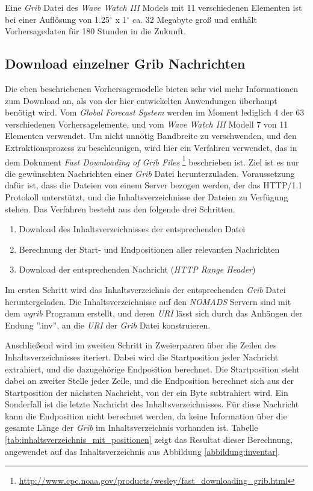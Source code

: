 Eine \textit{Grib} Datei des \textit{Wave Watch III} Models mit 11
verschiedenen Elementen ist bei einer Auflösung von
1.25$^{\circ}$ x 1$^{\circ}$ ca. 32 Megabyte groß und enthält
Vorhersagedaten für 180 Stunden in die Zukunft.

\subsection{Download einzelner Grib Nachrichten}
\label{subsec:download}

Die eben beschriebenen Vorhersagemodelle bieten sehr viel mehr
Informationen zum Download an, als von der hier entwickelten
Anwendungen überhaupt benötigt wird. Vom \textit{Global Forecast
  System} werden im Moment lediglich 4 der 63 verschiedenen
Vorhersagelemente, und vom \textit{Wave Watch III} Modell 7 von 11
Elementen verwendet. Um nicht unnötig Bandbreite zu verschwenden, und
den Extraktionsprozess zu beschleunigen, wird hier ein Verfahren
verwendet, das in dem Dokument \textit{Fast Downloading of Grib Files}
\footnote{\url{http://www.cpc.noaa.gov/products/wesley/fast_downloading_grib.html}}
beschrieben ist. Ziel ist es nur die gewünschten Nachrichten einer
\textit{Grib} Datei herunterzuladen. Voraussetzung dafür ist, dass die
Dateien von einem Server bezogen werden, der das HTTP/1.1 Protokoll
unterstützt, und die Inhaltsverzeichnisse der Dateien zu Verfügung
stehen. Das Verfahren besteht aus den folgende drei Schritten.

\begin{enumerate}
\item Download des Inhaltsverzeichnisses der entsprechenden Datei
\item Berechnung der Start- und Endpositionen aller relevanten Nachrichten
\item Download der entsprechenden Nachricht (\textit{HTTP Range Header})
\end{enumerate}

Im ersten Schritt wird das Inhaltsverzeichnis der entsprechenden
\textit{Grib} Datei heruntergeladen. Die Inhaltsverzeichnisse auf den
\textit{NOMADS} Servern sind mit dem \textit{wgrib} Programm erstellt,
und deren \textit{URI} lässt sich durch das Anhängen der Endung
''.inv'', an die \textit{URI} der \textit{Grib} Datei konstruieren.

Anschließend wird im zweiten Schritt in Zweierpaaren über die Zeilen
des Inhaltsverzeichnisses iteriert. Dabei wird die Startposition jeder
Nachricht extrahiert, und die dazugehörige Endposition berechnet. Die
Startposition steht dabei an zweiter Stelle jeder Zeile, und die
Endposition berechnet sich aus der Startposition der nächsten
Nachricht, von der ein Byte subtrahiert wird. Ein Sonderfall ist die
letzte Nachricht des Inhaltsverzeichnisses. Für diese Nachricht kann
die Endposition nicht berechnet werden, da keine Information über die
gesamte Länge der \textit{Grib} im Inhaltsverzeichnis vorhanden
ist. Tabelle \ref{tab:inhaltsverzeichnis_mit_positionen} zeigt das
Resultat dieser Berechnung, angewendet auf das Inhaltsverzeichnis aus
Abbildung \ref{abbildung:inventar}.

